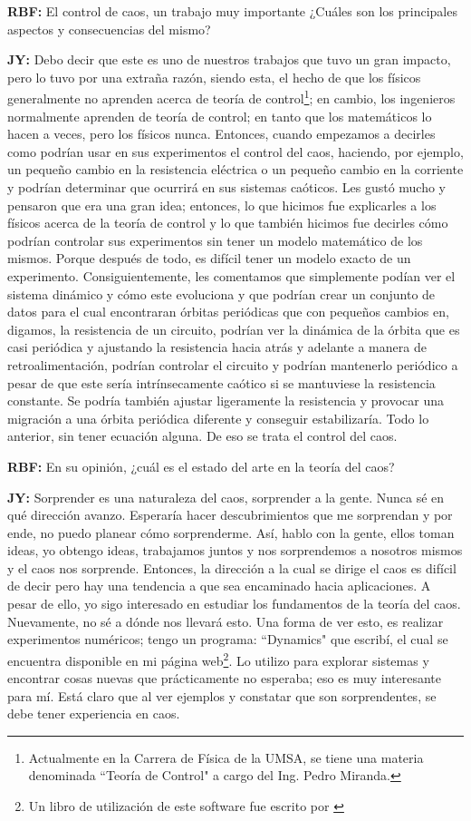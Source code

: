 \documentclass{rbf}
\newcommand{\mr}{{\bf RBF: }}
\newcommand{\jim}{{\bf JY: }}
\begin{document}
\mr El control de caos, un trabajo muy importante ¿Cuáles son los principales aspectos y consecuencias del mismo?

\jim Debo decir que este es uno de nuestros trabajos que tuvo un gran impacto, pero lo tuvo por una extraña razón, siendo esta, el hecho de que los físicos generalmente no aprenden acerca de teoría de control\footnote{Actualmente en la Carrera de Física de la UMSA, se tiene una materia denominada ``Teoría de Control" a cargo del Ing. Pedro Miranda.}; en cambio, los ingenieros normalmente aprenden de teoría de control; en tanto que los matemáticos lo hacen a veces, pero los físicos nunca. Entonces, cuando empezamos a decirles como podrían usar en sus experimentos el control del caos, haciendo, por ejemplo, un pequeño cambio en la resistencia eléctrica o un pequeño cambio en la corriente y podrían determinar que ocurrirá en sus sistemas caóticos. Les gustó mucho y pensaron que era una gran idea; entonces, lo que hicimos fue explicarles a los físicos acerca de la teoría de control y lo que también hicimos fue decirles cómo podrían controlar sus experimentos sin tener un modelo matemático de los mismos. Porque después de todo, es difícil tener un modelo exacto de un experimento. Consiguientemente, les comentamos
que simplemente podían ver el sistema dinámico y cómo este evoluciona y que podrían crear un conjunto de datos para el cual encontraran órbitas periódicas que con pequeños cambios en, digamos, la resistencia de un circuito, podrían ver la dinámica de la órbita que es casi periódica y ajustando la resistencia hacia atrás y adelante a manera de retroalimentación, podrían controlar el circuito y podrían mantenerlo periódico a pesar de que este sería intrínsecamente caótico si se mantuviese la resistencia constante. Se podría también ajustar ligeramente la resistencia y provocar una migración a una órbita periódica diferente y conseguir estabilizaría. Todo lo anterior, sin tener ecuación alguna. De eso se trata el control del caos.

\mr En su opinión, ¿cuál es el estado del arte en la teoría del caos?

\jim Sorprender es una naturaleza del caos, sorprender a la gente. Nunca sé en qué dirección avanzo. Esperaría hacer descubrimientos que me sorprendan y por ende, no puedo planear cómo sorprenderme. Así, hablo con la gente, ellos toman ideas, yo obtengo ideas, trabajamos juntos y nos sorprendemos a nosotros mismos
y el caos nos sorprende. Entonces, la dirección a la cual se dirige el caos es difícil de decir pero hay una tendencia a que sea encaminado hacia aplicaciones. A pesar de ello, yo sigo interesado en estudiar los fundamentos de la teoría del caos. Nuevamente, no sé a dónde nos llevará esto. Una forma de ver esto, es realizar experimentos numéricos; tengo un programa: ``Dynamics" que escribí, el cual se encuentra disponible en mi página web\footnote{Un libro de utilización de este software fue escrito por \cite{NUSSE94}}. Lo utilizo para explorar sistemas y encontrar cosas nuevas que prácticamente no esperaba; eso es muy interesante para mí. Está claro que al ver ejemplos y constatar que son sorprendentes, se debe tener experiencia en caos.
\end{document}
